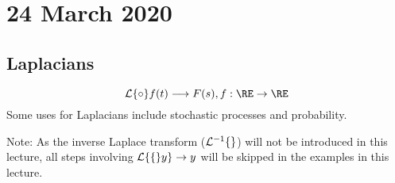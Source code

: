 \documentclass[diffeq.tex]{subfiles}
\begin{document}
\chapter{24 March 2020}
    \section{Laplacians}
    \begin{equation}
        \lp \circ f(t) \longrightarrow F(s), f : \RE \to \RE
    \end{equation}
    Some uses for Laplacians include stochastic processes and probability.

    Note: As the inverse Laplace transform ($\lpinv$) will not be introduced in this lecture, all steps involving $\mathcal{L}\{\{\}y\} \to y$ will be skipped in the examples in this lecture.
\end{document}
